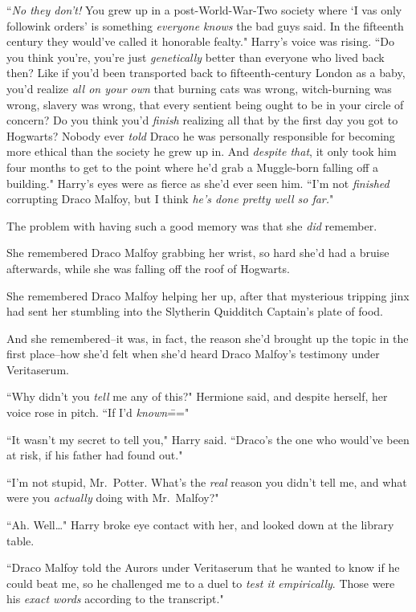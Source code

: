 ``\emph{No they don't!} You grew up in a post-World-War-Two society where `I vas only followink orders' is something \emph{everyone knows} the bad guys said. In the fifteenth century they would've called it honorable fealty." Harry's voice was rising. ``Do you think you're, you're just \emph{genetically} better than everyone who lived back then? Like if you'd been transported back to fifteenth-century London as a baby, you'd realize \emph{all on your own} that burning cats was wrong, witch-burning was wrong, slavery was wrong, that every sentient being ought to be in your circle of concern? Do you think you'd \emph{finish} realizing all that by the first day you got to Hogwarts? Nobody ever \emph{told} Draco he was personally responsible for becoming more ethical than the society he grew up in. And \emph{despite that}, it only took him four months to get to the point where he'd grab a Muggle-born falling off a building." Harry's eyes were as fierce as she'd ever seen him. ``I'm not \emph{finished} corrupting Draco Malfoy, but I think \emph{he's done pretty well so far.}"

The problem with having such a good memory was that she \emph{did} remember.

She remembered Draco Malfoy grabbing her wrist, so hard she'd had a bruise afterwards, while she was falling off the roof of Hogwarts.

She remembered Draco Malfoy helping her up, after that mysterious tripping jinx had sent her stumbling into the Slytherin Quidditch Captain's plate of food.

And she remembered\---it was, in fact, the reason she'd brought up the topic in the first place\---how she'd felt when she'd heard Draco Malfoy's testimony under Veritaserum.

``Why didn't you \emph{tell} me any of this?" Hermione said, and despite herself, her voice rose in pitch. ``If I'd \emph{known}\==="

``It wasn't my secret to tell you," Harry said. ``Draco's the one who would've been at risk, if his father had found out."

``I'm not stupid, Mr.~Potter. What's the \emph{real} reason you didn't tell me, and what were you \emph{actually} doing with Mr.~Malfoy?"

``Ah. Well{\ldots}" Harry broke eye contact with her, and looked down at the library table.

``Draco Malfoy told the Aurors under Veritaserum that he wanted to know if he could beat me, so he challenged me to a duel to \emph{test it empirically}. Those were his \emph{exact words} according to the transcript."

